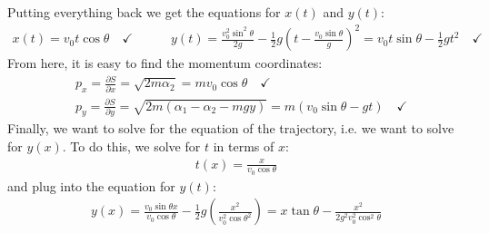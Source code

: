 \documentclass{article}
\theoremstyle{definition}
\newcommand{\p}{\partial}
\newcommand{\al}{\alpha}
\newcommand{\f}[2]{\frac{#1}{#2}}
\newcommand{\lp}{\left(}
\newcommand{\rp}{\right)}
\begin{document}
Putting everything back we get the equations for $x(t)$ and $y(t)$:
\begin{align*}
\boxed{x(t) = v_0 t\cos\theta}\quad  \checkmark \quad\quad\quad \boxed{y(t) = \f{v_0^2\sin^2\theta}{2g} - \f{1}{2}g\lp t - \f{v_0\sin\theta}{g} \rp^2 = v_0t\sin\theta-\f{1}{2}gt^2} \quad \checkmark
\end{align*}
From here, it is easy to find the momentum coordinates:
\begin{align*}
&p_x = \f{\p S}{\p x} = \sqrt{2m\al_2} = mv_0\cos\theta \quad\checkmark \\
&p_y = \f{\p S}{\p y} = \sqrt{2m(\al_1 - \al_2 - mgy)} = m(v_0\sin\theta - gt) \quad\checkmark
\end{align*}
Finally, we want to solve for the equation of the trajectory, i.e. we want to solve for $y(x)$. To do this, we solve for $t$ in terms of $x$:
\begin{align*}
t(x) = \f{x}{v_0\cos\theta}
\end{align*}
and plug into the equation for $y(t)$:
\begin{align*}
\boxed{y(x) = \f{v_0\sin\theta x}{v_0\cos\theta} - \f{1}{2}g \lp \f{x^2}{v_0^2\cos\theta^2} \rp = x\tan\theta - \f{x^2}{2g^2v_0^2\cos^2\theta}}
\end{align*}
\end{document}
